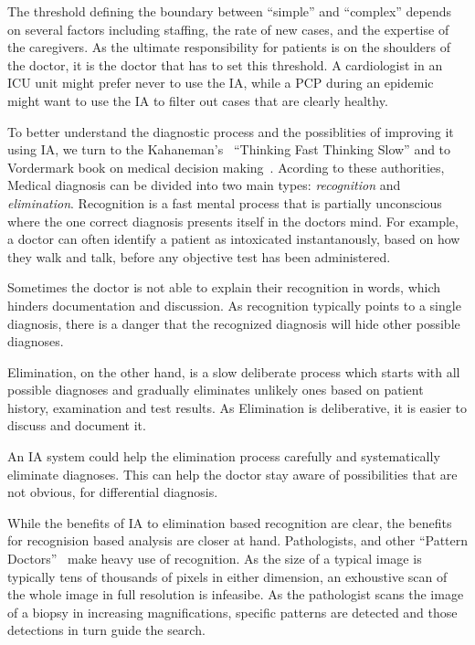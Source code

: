 \documentclass[11pt]{pnas-new}
\begin{document}
The threshold defining the boundary between ``simple'' and ``complex''
depends on several factors including staffing, the rate of new cases, 
and the expertise of the caregivers. As the ultimate responsibility
for patients is on the shoulders of the doctor, it is the doctor that
has to set this threshold. A cardiologist in an ICU unit might prefer never
to use the IA, while a PCP during an epidemic might want to use the IA
to filter out cases that are clearly healthy.

To better understand the diagnostic process and the possiblities  of
improving it using IA, we turn to the Kahaneman's~\cite{kahneman2011thinking}
``Thinking Fast Thinking Slow'' and to Vordermark book on medical
decision making~\cite{vordermark2019introduction}. Acording to these authorities,
Medical diagnosis can be divided into two main types: {\em
  recognition} and {\em elimination}. Recognition is a fast mental
process that is partially unconscious where the one correct diagnosis
presents itself in the doctors mind. For example, a doctor can often
identify a patient as intoxicated instantanously, based on how they
walk and talk, before any objective test has been administered.

Sometimes the doctor is not able to explain their recognition in
words, which hinders documentation and discussion. As recognition
typically points to a single diagnosis, there is a danger that the
recognized diagnosis will hide other possible diagnoses.

Elimination, on the other hand, is a slow deliberate process which
starts with all possible diagnoses and gradually eliminates unlikely
ones based on patient history, examination and test results. As
Elimination is deliberative, it is easier to discuss and document it.

An IA system could help the elimination process carefully and
systematically eliminate diagnoses. This can help the doctor stay
aware of possibilities that are not obvious, for differential
diagnosis.

While the benefits of IA to elimination based recognition are clear,
the benefits for recognision based analysis are closer at hand.
Pathologists, and other ``Pattern Doctors''~\cite{Topol} make heavy
use of recognition. As the size of a typical image is typically tens
of thousands of pixels in either dimension, an exhoustive scan of the
whole image in full resolution is infeasibe. As the pathologist scans
the image of a biopsy in increasing magnifications,
specific patterns are detected and those detections in turn guide the search.
\end{document}

